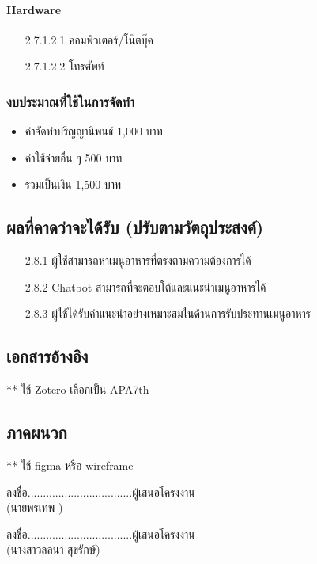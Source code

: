 \documentclass[12pt,a4paper]{article}
\begin{document}
\paragraph{Hardware}
\begin{enumerate}
    \item[2.7.1.2.1] คอมพิวเตอร์/โน๊ตบุ๊ค
    \item[2.7.1.2.2] โทรศัพท์
\end{enumerate}

\subsubsection{งบประมาณที่ใช้ในการจัดทำ}
\begin{itemize}
    \item ค่าจัดทำปริญญานิพนธ์ 1,000 บาท
    \item ค่าใช้จ่ายอื่น ๆ 500 บาท
    \item รวมเป็นเงิน 1,500 บาท
\end{itemize}

\subsection{ผลที่คาดว่าจะได้รับ (ปรับตามวัตถุประสงค์)}
\begin{enumerate}
    \item[2.8.1] ผู้ใช้สามารถหาเมนูอาหารที่ตรงตามความต้องการได้
    \item[2.8.2] Chatbot สามารถที่จะตอบโต้และแนะนำเมนูอาหารได้
    \item[2.8.3] ผู้ใช้ได้รับคำแนะนำอย่างเหมาะสมในด้านการรับประทานเมนูอาหาร
\end{enumerate}

\subsection{เอกสารอ้างอิง}
** ใช้ Zotero เลือกเป็น APA7th

\subsection{ภาคผนวก}
** ใช้ figma หรือ wireframe

\vspace{3cm}

\begin{minipage}{0.5\textwidth}
ลงชื่อ..................................ผู้เสนอโครงงาน\\
(นายพรเทพ )
\end{minipage}
\begin{minipage}{0.5\textwidth}
ลงชื่อ..................................ผู้เสนอโครงงาน\\
(นางสาวลลนา สุขรักษ์)
\end{minipage}
\end{document}
